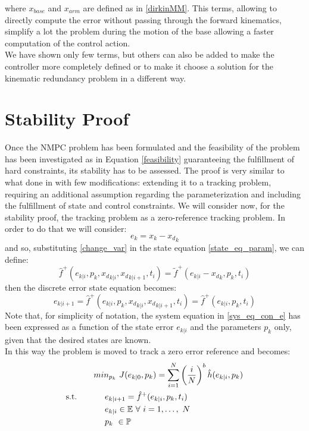 where $x_{base}$ and $x_{arm}$ are defined as in \ref{dirkinMM}.
This terms, allowing to directly compute the error without passing through the forward kinematics, simplify a lot the problem during the motion of the base allowing a faster computation of the control action.\\We have shown only few terms, but others can also be added to make the controller more completely defined or to make it choose a solution for the kinematic redundancy problem in a different way. 

\section{Stability Proof}\label{stabproof}

Once the NMPC problem has been formulated and the feasibility of the problem has been investigated as in Equation \ref{feasibility} guaranteeing the fulfillment of hard  constraints, its stability has to be assessed. The proof is very similar to what done in \cite{alamir2018stability} with few modifications: extending it to a tracking problem, requiring an additional assumption regarding the parameterization and including the fulfillment of state and control constraints.
We will consider now, for the stability proof, the tracking problem as a zero-reference tracking problem. In order to do that we will consider:
\begin{equation}\label{change_var}
    e_k=x_k-{x_d}_k
\end{equation}
and so, substituting \ref{change_var} in the state equation \ref{state_eq_param}, we can define:
\begin{equation} \label{NLsystem}
	\hat{f}^+(e_{k|i},p_k,{{x_d}_{k|i}},{{x_d}_{k|i+1}},t_i) = \tilde{f}^+(e_{k|i}-{x_d}_k,p_k,t_i)
\end{equation}
then the discrete error state equation becomes:
\begin{equation}\label{sys_eq_con_e}
    e_{k|i+1}=\hat{f}^+(e_{k|i},p_k,{{x_d}_{k|i}},{{x_d}_{k|i+1}},t_i)=\hat{f}^+(e_{k|i},p_k,t_i)
\end{equation}
Note that, for simplicity of notation, the system equation in \ref{sys_eq_con_e} has been expressed as a function of the state error ${e_{k|i}}$ and the parameters $p_k$ only, given that the desired states are known.\\
In this way the problem is moved to track a zero error reference and becomes: 
\begin{equation} \label{ourproblem_stab}
\begin{split}
		& min_{{p}_k}\ J({e}_{k|0},{p}_k) =\sum_{i=1}^{N}\left(\frac{i}{N}\right)^b\hat{h}(e_{k|i},{p}_{k}) \\
		\textnormal{s.t.}\qquad
		&\ \ \ \ e_{k|i+1}=\hat{f}^+(e_{k|i},p_k,t_i) \\
		&\ \ \ \ e_{k|i} \in \mathbb{E}\ \forall\ i=1,\dots,\ N  \\
		&\ \ \ \ {p}_k\   \in \mathbb{P}\ \\
	\end{split}	
\end{equation}
